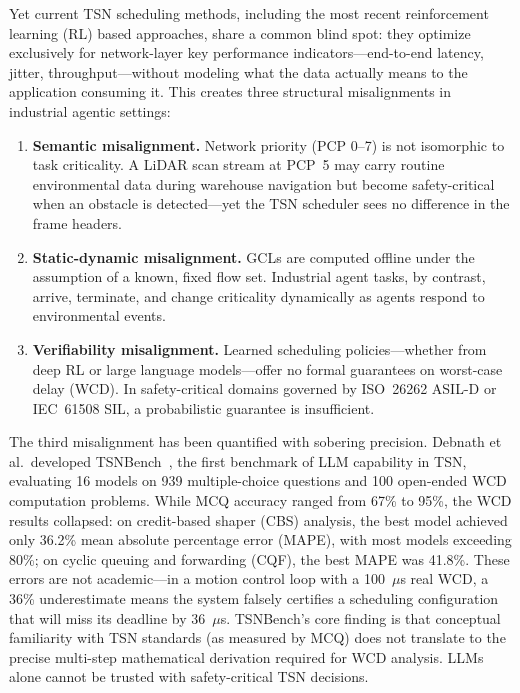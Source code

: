 \documentclass[conference]{IEEEtran}
\begin{document}
Yet current TSN scheduling methods, including the most recent reinforcement learning (RL) based approaches, share a common blind spot: they optimize exclusively for network-layer key performance indicators---end-to-end latency, jitter, throughput---without modeling what the data actually means to the application consuming it. This creates three structural misalignments in industrial agentic settings:

\begin{enumerate}
\item \textbf{Semantic misalignment.} Network priority (PCP 0--7) is not isomorphic to task criticality. A LiDAR scan stream at PCP~5 may carry routine environmental data during warehouse navigation but become safety-critical when an obstacle is detected---yet the TSN scheduler sees no difference in the frame headers.
\item \textbf{Static-dynamic misalignment.} GCLs are computed offline under the assumption of a known, fixed flow set. Industrial agent tasks, by contrast, arrive, terminate, and change criticality dynamically as agents respond to environmental events.
\item \textbf{Verifiability misalignment.} Learned scheduling policies---whether from deep RL or large language models---offer no formal guarantees on worst-case delay (WCD). In safety-critical domains governed by ISO~26262 ASIL-D or IEC~61508 SIL, a probabilistic guarantee is insufficient.
\end{enumerate}

The third misalignment has been quantified with sobering precision. Debnath et al.~developed TSNBench~\cite{debnath2026tsnbench}, the first benchmark of LLM capability in TSN, evaluating 16 models on 939 multiple-choice questions and 100 open-ended WCD computation problems. While MCQ accuracy ranged from 67\% to 95\%, the WCD results collapsed: on credit-based shaper (CBS) analysis, the best model achieved only 36.2\% mean absolute percentage error (MAPE), with most models exceeding 80\%; on cyclic queuing and forwarding (CQF), the best MAPE was 41.8\%. These errors are not academic---in a motion control loop with a 100~$\mu$s real WCD, a 36\% underestimate means the system falsely certifies a scheduling configuration that will miss its deadline by 36~$\mu$s. TSNBench's core finding is that conceptual familiarity with TSN standards (as measured by MCQ) does not translate to the precise multi-step mathematical derivation required for WCD analysis. LLMs alone cannot be trusted with safety-critical TSN decisions.
\end{document}
